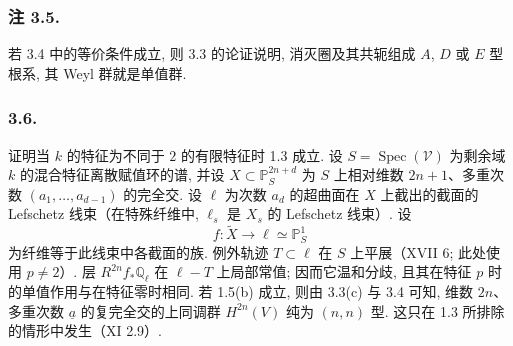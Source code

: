 \subsubsection*{注 3.5.}
若 3.4 中的等价条件成立, 则 3.3 的论证说明, 消灭圈及其共轭组成 $A$, $D$ 或 $E$ 型根系, 其 Weyl 群就是单值群.

\subsubsection*{3.6.}
证明当 $k$ 的特征为不同于 $2$ 的有限特征时 1.3 成立. 设 $S=\operatorname{Spec}(\mathcal V)$ 为剩余域 $k$ 的混合特征离散赋值环的谱, 并设 $X\subset\mathbb P_S^{2n+d}$ 为 $S$ 上相对维数 $2n+1$、多重次数 $(a_1,\ldots,a_{d-1})$ 的完全交. 设 $\ell$ 为次数 $a_d$ 的超曲面在 $X$ 上截出的截面的 Lefschetz 线束（在特殊纤维中, $\ell_s$ 是 $X_s$ 的 Lefschetz 线束）. 设
\[
  f:\widetilde X\longrightarrow\ell\simeq\mathbb P^1_S
\]
为纤维等于此线束中各截面的族. 例外轨迹 $T\subset\ell$ 在 $S$ 上平展（XVII 6; 此处使用 $p\ne2$）. 层 $R^{2n}f_*\mathbb Q_\ell$ 在 $\ell-T$ 上局部常值; 因而它温和分歧, 且其在特征 $p$ 时的单值作用与在特征零时相同. 若 1.5(b) 成立, 则由 3.3(c) 与 3.4 可知, 维数 $2n$、多重次数 $\underline a$ 的复完全交的上同调群 $H^{2n}(V)$ 纯为 $(n,n)$ 型. 这只在 1.3 所排除的情形中发生（XI 2.9）.

